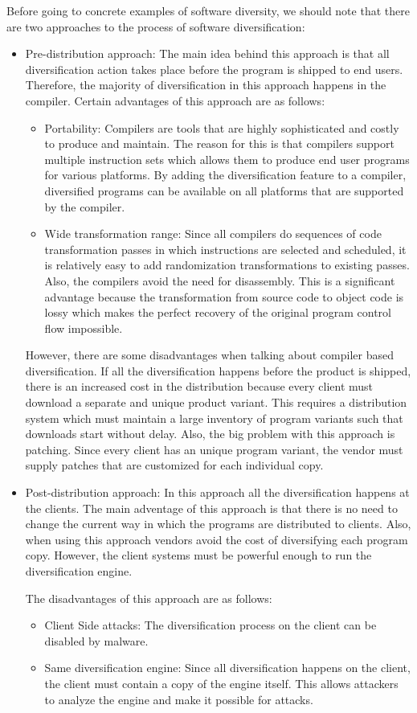 \documentclass[11pt,final,conference,a4paper]{IEEEtran}
\begin{document}
Before going to concrete examples of software diversity, we should note that there are two approaches to the process of software diversification:
\begin{itemize}
\item Pre-distribution approach: The main idea behind this approach is that all diversification action takes place before the program is shipped to end users. Therefore, the majority of diversification in this approach happens in the compiler. Certain advantages of this approach are as follows:
\begin{itemize}
\item Portability: Compilers are tools that are highly sophisticated and costly to produce and maintain. The reason for this is that compilers support multiple instruction sets which allows them to produce end user programs for various platforms. By adding the diversification feature to a compiler, diversified programs can be available on all platforms that are supported by the compiler.
\item Wide transformation range: Since all compilers do sequences of code transformation passes in which instructions are selected and scheduled, it is relatively easy to add randomization transformations to existing passes. Also, the compilers avoid the need for disassembly. This is a significant advantage because the transformation from source code to object code is lossy which makes the perfect recovery of the original program control flow impossible.
\end{itemize}
However, there are some disadvantages when talking about compiler based diversification. If all the diversification happens before the product is shipped, there is an increased cost in the distribution because every client must download a separate and unique product variant. This requires a distribution system which must maintain a large inventory of program variants such that downloads start without delay. Also, the big problem with this approach is patching. Since every client has an unique program variant, the vendor must supply patches that are customized for each individual copy.
\item Post-distribution approach: In this approach all the diversification happens at the clients. The main adventage of this approach is that there is no need to change the current way in which the programs are distributed to clients. Also, when using this approach vendors avoid the cost of diversifying each program copy. However, the client systems must be powerful enough to run the diversification engine.

The disadvantages of this approach are as follows:
\begin{itemize}
\item Client Side attacks: The diversification process on the client can be disabled by malware.
\item Same diversification engine: Since all diversification happens on the client, the client must contain a copy of the engine itself. This allows attackers to analyze the engine and make it possible for attacks.
\end{itemize}
\end{itemize}
\end{document}
